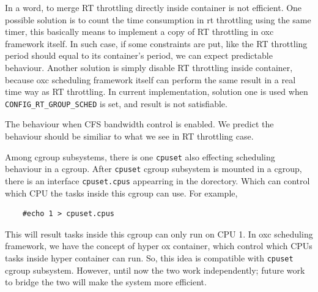 In a word, to merge RT throttling directly inside container is not efficient.
One possible solution is to count the time consumption in rt throttling using 
the same timer, this basically means to implement a copy of RT throttling 
in oxc framework itself. In such case, if some constraints are put, like
the RT throttling period should equal to its container's period, we can
expect predictable behaviour.
Another solution is simply disable RT throttling inside container, because
oxc scheduling framework itself can perform the same result in a real time
way as RT throttling. 
In current implementation, solution one is used when 
\texttt{CONFIG\_RT\_GROUP\_SCHED} is set, and result is not satisfiable.

The behaviour when CFS bandwidth control is enabled. We predict the behaviour
should be similiar to what we see in RT throttling case.

Among cgroup subsystems, there is one \texttt{cpuset} also effecting scheduling
behaviour in a cgroup.
After \texttt{cpuset} cgroup subsystem is mounted in a cgroup, there is an 
interface \texttt{cpuset.cpus} appearring in the dorectory. Which can control
which CPU the tasks inside this cgroup can use.
For example, 
\begin{lstlisting}
	#echo 1 > cpuset.cpus
\end{lstlisting}
This will result tasks inside this cgroup can only run on CPU 1.
In oxc scheduling framework, we have the concept of hyper ox container, which 
control which CPUs tasks inside hyper container can run. So, this idea is
compatible with \texttt{cpuset} cgroup subsystem. However, until now the two
work independently; future work to bridge the two will make the system more
efficient.
